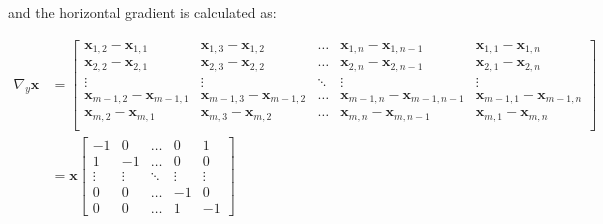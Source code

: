 \documentclass[12pt]{article}
\begin{document}
and the horizontal gradient is calculated as:

\begin{equation}
  \begin{align}
  \nabla_{y} \mathbf{x} &= \begin{bmatrix}
    \mathbf{x}_{1,2} - \mathbf{x}_{1,1} & \mathbf{x}_{1,3} - \mathbf{x}_{1,2} & \ldots & \mathbf{x}_{1,n} - \mathbf{x}_{1,n-1} & \mathbf{x}_{1,1} - \mathbf{x}_{1,n} \\
    \mathbf{x}_{2,2} - \mathbf{x}_{2,1} & \mathbf{x}_{2,3} - \mathbf{x}_{2,2} & \ldots & \mathbf{x}_{2,n} - \mathbf{x}_{2,n-1} & \mathbf{x}_{2,1} - \mathbf{x}_{2,n}  \\
    \vdots & \vdots & \ddots & \vdots & \vdots \\
    \mathbf{x}_{m-1,2} - \mathbf{x}_{m-1,1} & \mathbf{x}_{m-1,3} - \mathbf{x}_{m-1,2} & \ldots & \mathbf{x}_{m-1,n} - \mathbf{x}_{m-1,n-1} & \mathbf{x}_{m-1,1} - \mathbf{x}_{m-1,n} \\
    \mathbf{x}_{m,2} - \mathbf{x}_{m,1} & \mathbf{x}_{m,3} - \mathbf{x}_{m,2} & \ldots & \mathbf{x}_{m,n} - \mathbf{x}_{m,n-1} & \mathbf{x}_{m,1} - \mathbf{x}_{m,n} \\
  \end{bmatrix} \\
  &=  \mathbf{x} \begin{bmatrix}
    -1 & 0 & \ldots & 0 & 1 \\
    1 & -1 & \ldots & 0 & 0 \\
    \vdots & \vdots & \ddots & \vdots & \vdots \\
    0 & 0 & \ldots & -1 & 0 \\
    0 & 0 & \ldots & 1 & -1
    \end{bmatrix}
  \end{align}
\end{equation}






\end{document}
